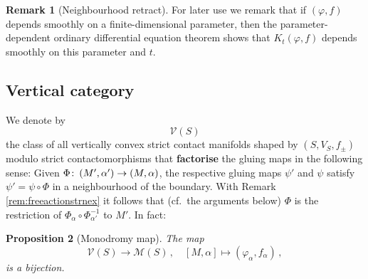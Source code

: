 \documentclass{amsart}
\newtheorem{prop}{Proposition}[subsection]
\theoremstyle{definition}
\newtheorem{rem}[prop]{Remark}
\def\co{\colon\thinspace}
\newcommand{\MM}{\mathcal M}
\newcommand{\VV}{\mathcal V}
\newcommand{\lra}{\longrightarrow}
\newcommand{\ra}{\rightarrow}
\begin{document}
\begin{rem}[Neighbourhood retract]
For later use we remark that
if $(\varphi,f)$ depends smoothly on a
finite-dimensional parameter,
then the parameter-dependent ordinary differential
equation theorem shows that
$K_t(\varphi,f)$ depends smoothly on this parameter and $t$.
\end{rem}



\subsection{Vertical category}
\label{subsec:verticalcategory}


We denote by
  \[
  \VV(S)
  \]
the class of all vertically convex
strict contact manifolds shaped by $(S,V_S,f_{\pm})$
modulo strict contactomorphisms
that {\bf factorise} the gluing maps
in the following sense:
Given
$\Phi\co(M',\alpha')\ra(M,\alpha)$,
the respective gluing maps $\psi'$ and $\psi$ satisfy
$\psi'=\psi\circ\Phi$
in a neighbourhood of the boundary.
With Remark \ref{rem:freeactionstrnex} it follows that
(cf.\ the arguments below)
$\Phi$ is the restriction of
$\Phi_{\alpha}\circ\Phi_{\alpha'}^{-1}$ to $M'$.
In fact:


\begin{prop}[Monodromy map]
\label{prop:monodromymap}
  The map
  \[
  \VV(S)\lra\MM(S)
  \,,
  \quad
  [M,\alpha]\longmapsto(\varphi_{\alpha},f_{\alpha})
  \,,
  \]
  is a bijection.
\end{prop}
\end{document}
